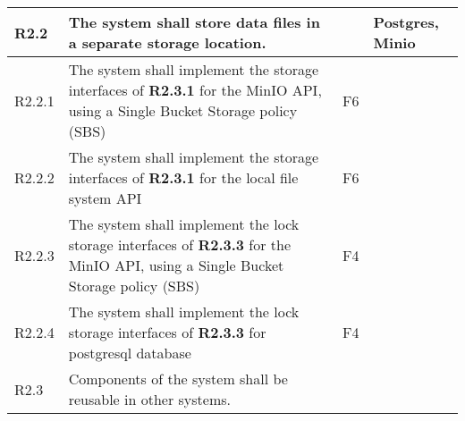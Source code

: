 \documentclass[a4paper,11pt]{article}
\begin{document}
\begin{landscape}
\begin{longtable}{|p{1cm}|p{19cm}|p{2cm}|p{3cm}|}
        \rowcolor[HTML]{DDDDDD}        R2.2       & The system shall store data files in a separate storage location.                                                                                                                                                                                                                     &                       & Postgres, Minio                          \\ \hline
        \rowcolor[HTML]{EEFFEE}        R2.2.1     & The system shall implement the storage interfaces of \textbf{R2.3.1} for the MinIO API, using a Single Bucket Storage policy (SBS)                                                                                                                                                    & F6                    &                                          \\\hline
        \rowcolor[HTML]{FFEEEE}        R2.2.2     & The system shall implement the storage interfaces of \textbf{R2.3.1} for the local file system API                                                                                                                                                                                    & F6                    &                                          \\\hline
        \rowcolor[HTML]{FFEEEE}        R2.2.3     & The system shall implement the lock storage interfaces of \textbf{R2.3.3} for the MinIO API, using a Single Bucket Storage policy (SBS)                                                                                                                                               & F4                    &                                          \\\hline
        \rowcolor[HTML]{EEFFEE}        R2.2.4     & The system shall implement the lock storage interfaces of \textbf{R2.3.3} for postgresql database                                                                                                                                                                                     & F4                    &                                          \\\hline
        \rowcolor[HTML]{DDDDDD}        R2.3       & Components of the system shall be reusable in other systems.                                                                                                                                                                                                                          &                       &                                          \\ \hline

\end{longtable}
\end{landscape}
\end{document}
